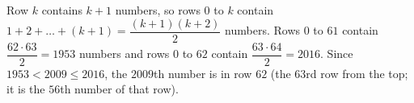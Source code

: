 Row $k$ contains $k+1$ numbers, so rows $0$ to $k$ contain $1+2+\dots+(k+1)=\dfrac{(k+1)(k+2)}{2}$ numbers. Rows $0$ to $61$ contain $\dfrac{62\cdot63}{2}=1953$ numbers and rows $0$ to $62$ contain $\dfrac{63\cdot64}{2}=2016$. Since $1953<2009\le2016$, the $2009$th number is in row $\boxed{62}$ (the $63$rd row from the top; it is the $56$th number of that row).

